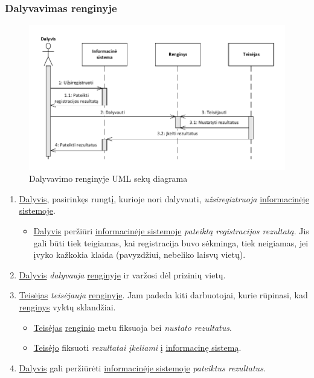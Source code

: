 \documentclass{VUMIFPSkursinis}
\begin{document}
    \subsubsection*{Dalyvavimas renginyje}
	
	    \begin{figure}[H]
			\centering
			\includegraphics[width=\textwidth]{img/IsPSI1ScenarijausSekuDiagrama2}
			\caption{Dalyvavimo renginyje UML sekų diagrama}
			\label{fig:scenarijusDalyvavimoSekuDiagrama}
		\end{figure}
      
		\begin{enumerate}
			\item  \underline{Dalyvis}, pasirinkęs rungtį, kurioje nori dalyvauti, \textit{užsiregiztruoja} \underline{informacinėje sistemoje}.
			\begin{itemize}
				\item \underline{Dalyvis} peržiūri \underline{informacinėje sistemoje}  \textit{pateiktą registracijos rezultatą}. Jis gali būti tiek teigiamas, kai
					registracija buvo sėkminga, tiek neigiamas, jei įvyko kažkokia klaida (pavyzdžiui, nebeliko laisvų vietų).
			\end{itemize}
			\item \underline{Dalyvis} \textit{dalyvauja} \underline{renginyje} ir varžosi dėl prizinių vietų.
			\item \underline{Teisėjas} \textit{teisėjauja} \underline{renginyje}. Jam padeda kiti darbuotojai, kurie rūpinasi, kad \underline{renginys} vyktų sklandžiai. 
			\begin{itemize}
				\item \underline{Teisėjas} \underline{renginio} metu fiksuoja bei  \textit{nustato rezultatus}.
				\item  \underline{Teisėjo} fiksuoti  \textit{rezultatai įkeliami} į \underline{informacinę sistemą}.
			\end{itemize}
			\item \underline{Dalyvis} gali peržiūrėti \underline{informacinėje sistemoje}  \textit{pateiktus rezultatus}. 
		\end{enumerate}
      
\end{document}
